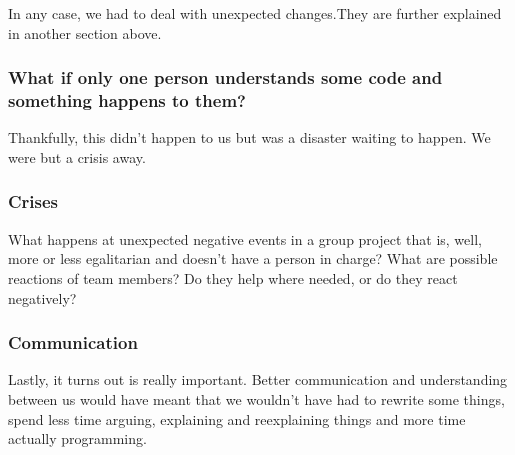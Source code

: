     In any case, we had to deal with unexpected changes.They are further explained in another section above. %
    

\subsubsection{What if only one person understands some code and something happens to them?}
    Thankfully, this didn't happen to us but was a disaster waiting to happen. We were but a crisis away.
    
\subsubsection{Crises}
    What happens at unexpected negative events in a group project that is, well,
    more or less egalitarian and doesn't have a person in charge? What are possible reactions of team members?
    Do they help where needed, or do they react negatively?

\subsubsection{Communication}
    Lastly, it turns out is really important. Better communication and understanding between us
    would have meant that we wouldn't have had to rewrite some things, spend less time arguing,
    explaining and reexplaining things and more time actually programming.
